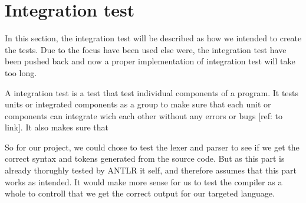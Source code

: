 \section{Integration test}\label{subsec:integrationtest}
In this section, the integration test will be described as how we intended to create the tests. Due to the focus have been used else were, the integration test have been pushed back and now a proper implementation of integration test will take too long.

A integration test is a test that test individual components of a program. It tests units or integrated components as a group to make sure that each unit or components can integrate wich each other without any errors or bugs [ref: to link]. It also makes sure that




So for our project, we could chose to test the lexer and parser to see if we get the correct syntax and tokens generated from the source code. But as this part is already thorughly tested by ANTLR it self, and therefore assumes that this part works as intended. It would make more sense for us to test the compiler as a whole to controll that we get the correct output for our targeted language.



